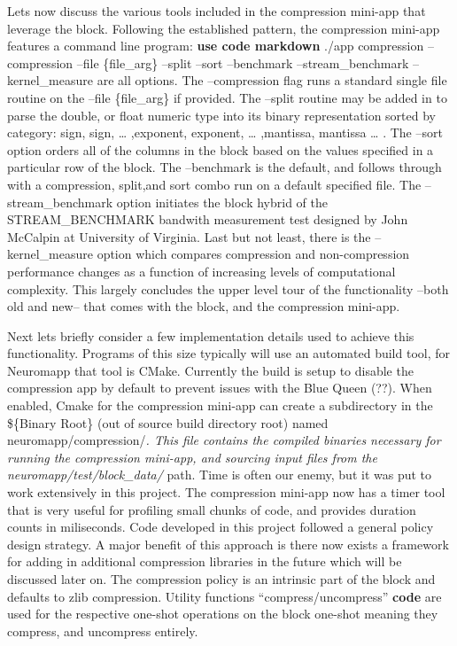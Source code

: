 Lets now discuss the various tools included in the compression mini-app
that leverage the block. Following the established pattern, the
compression mini-app features a command line program: \textbf{use code
markdown} ./app compression --compression --file \{file\_arg\} --split
--sort --benchmark --stream\_benchmark --kernel\_measure are all
options. The --compression flag runs a standard single file routine on
the --file \{file\_arg\} if provided. The --split routine may be added
in to parse the double, or float numeric type into its binary
representation sorted by category: sign, sign, \ldots{} ,exponent,
exponent, \ldots{} ,mantissa, mantissa \ldots{} . The --sort option
orders all of the columns in the block based on the values specified in
a particular row of the block. The --benchmark is the default, and
follows through with a compression, split,and sort combo run on a
default specified file. The --stream\_benchmark option initiates the
block hybrid of the STREAM\_BENCHMARK bandwith measurement test designed
by John McCalpin at University of Virginia. Last but not least, there is
the --kernel\_measure option which compares compression and
non-compression performance changes as a function of increasing levels
of computational complexity. This largely concludes the upper level tour
of the functionality --both old and new-- that comes with the block, and
the compression mini-app.

Next lets briefly consider a few implementation details used to achieve
this functionality. Programs of this size typically will use an
automated build tool, for Neuromapp that tool is CMake. Currently the
build is setup to disable the compression app by default to prevent
issues with the Blue Queen (??). When enabled, Cmake for the compression
mini-app can create a subdirectory in the \$\{Binary Root\} (out of
source build directory root) named neuromapp/compression/\emph{. This
file contains the compiled binaries necessary for running the
compression mini-app, and sourcing input files from the
neuromapp/test/block\_data/} path. Time is often our enemy, but it was
put to work extensively in this project. The compression mini-app now
has a timer tool that is very useful for profiling small chunks of code,
and provides duration counts in miliseconds. Code developed in this
project followed a general policy design strategy. A major benefit of
this approach is there now exists a framework for adding in additional
compression libraries in the future which will be discussed later on.
The compression policy is an intrinsic part of the block and defaults to
zlib compression. Utility functions ``compress/uncompress''
\textbf{code} are used for the respective one-shot operations on the
block one-shot meaning they compress, and uncompress entirely.

